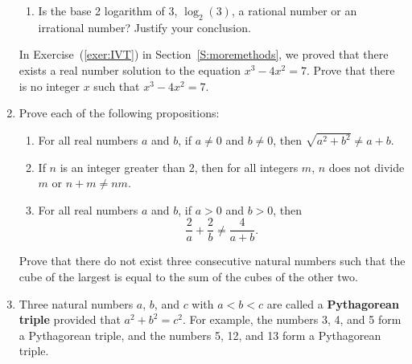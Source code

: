 \begin{enumerate}
\begin{enumerate}
  \item Is the base 2 logarithm of 3, $\log _2 (3)$,  a rational number or an irrational number? Justify your conclusion. 
\end{enumerate}
\label{exer:sec33-9}%



\xitem In Exercise~(\ref{exer:IVT}) in Section~\ref{S:moremethods}, we proved that there exists a real number solution to the equation $x^3  - 4x^2  = 7$.  Prove that there is no integer $x$ such that  $x^3  - 4x^2  = 7$.
\label{exer:sec33IVT}%
\newpage

\item Prove each of the following propositions:
\label{exer:sec33-11}%

\begin{enumerate}
  \yitem For each real number  $\theta $, if  $0 < \theta  < \dfrac{\textstyle \pi }{\textstyle 2}$, then  $\left[ {\sin (\theta)  + \cos (\theta) } \right] > 1$.

\item For all real numbers  $a$  and  $b$, if  $a \ne 0$  and  $b \ne 0$, then  
$\sqrt{a^2 + b^2} \ne a + b$.

 \item If  $n$  is an integer greater than 2, then for all integers  $m$,  $n$  does not divide  $m$   or  $n + m \ne nm$.

\item For all real numbers $a$ and $b$, if $a > 0$ and $b > 0$, then 
\[
\frac{2}{a} + \frac{2}{b} \ne \frac{4}{a + b}.
\]
\end{enumerate}


\xitem Prove that there do not exist three consecutive natural numbers such that the cube of the largest is equal to the sum of the cubes of the other two.
\label{exer:sec35-10}%




\item Three natural numbers $a$, $b$, and $c$ with $a < b < c$ are called a \textbf{Pythagorean triple}
%
 provided that $a^2 + b^2 = c^2$.  For example,  the numbers 3, 4, and 5 form a Pythagorean triple, and the numbers 5, 12, and 13 form a Pythagorean triple.


\end{enumerate}
